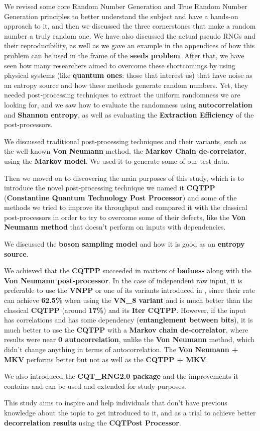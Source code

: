 We revised some core Random Number Generation and True Random Number Generation principles to better understand the subject and have a hands-on approach to it, and then we discussed the three cornerstones that make a random number a truly random one. We have also discussed the actual pseudo RNGs and their reproducibility, as well as we gave an example in the appendices of how this problem can be used in the frame of the \textbf{seeds problem}. After that, we have seen how many researchers aimed to overcome these shortcomings by using physical systems (like \textbf{quantum ones}: those that interest us) that have noise as an entropy source and how these methods generate random numbers. Yet, they needed post-processing techniques to extract the uniform randomness we are looking for, and we saw how to evaluate the randomness using \textbf{autocorrelation} and \textbf{Shannon entropy}, as well as evaluating the \textbf{Extraction Efficiency} of the post-processors.

We discussed traditional post-processing techniques and their variants, such as the well-known \textbf{Von Neumann} method, the \textbf{Markov Chain de-correlator}, using the \textbf{Markov model}. We used it to generate some of our test data.

Then we moved on to discovering the main purposes of this study, which is to introduce the novel post-processing technique we named it \textbf{CQTPP} (\textbf{Constantine Quantum Technology Post Processor}) and some of the methods we tried to improve its throughput and compared it with the classical post-processors in order to try to overcome some of their defects, like the \textbf{Von Neumann method} that doesn't perform on inputs with dependencies.

We discussed the \textbf{boson sampling model} and how it is good as an \textbf{entropy source}.

We achieved that the \textbf{CQTPP} succeeded in matters of \textbf{badness} along with the \textbf{Von Neumann post-processor}. In the case of independent raw input, it is preferable to use the \textbf{VNPP} or one of its variants introduced in \cite{zonga}, since their rate can achieve \textbf{62.5\%} when using the \textbf{VN\_8 variant} and is much better than the classical \textbf{CQTPP} (around \textbf{17\%}) and its \textbf{Iter CQTPP}. However, if the input has correlations and has some dependency (\textbf{entanglement between bits}), it is much better to use the \textbf{CQTPP} with a \textbf{Markov chain de-correlator}, where results were near \textbf{0 autocorrelation}, unlike the \textbf{Von Neumann} method, which didn't change anything in terms of autocorrelation. The \textbf{Von Neumann + MKV} performs better but not as well as the \textbf{CQTPP + MKV}.

We also introduced the \textbf{CQT\_RNG2.0 package} and the improvements it contains and can be used and extended for study purposes.

This study aims to inspire and help individuals that don't have previous knowledge about the topic to get introduced to it, and as a trial to achieve better \textbf{decorrelation results} using the \textbf{CQTPost Processor}.
